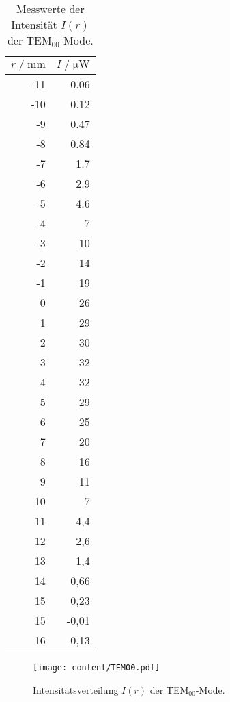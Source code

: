 \begin{table}[H]
  \centering
  \footnotesize
  \caption{Messwerte der Intensität $I(r)$ der TEM$_{00}$-Mode.}
  \label{tab:TEM00}
  \begin{tabular}{r r}
  \toprule
  $r \;/\; \si{\milli\meter}$ & $I \;/\; \si{\micro\watt}$ \\
  \midrule
-11 & -0.06   \\
-10 & 0.12    \\
-9  & 0.47    \\
-8  &  0.84   \\
-7  &  1.7    \\
-6  &  2.9    \\
-5  &  4.6    \\
-4  &  7    \\
-3  &  10   \\
-2  &  14   \\
-1  &  19   \\
0   &  26   \\
1   &  29   \\
2   &  30   \\
3   &  32   \\
4   &  32   \\
5   &  29   \\
6   &  25   \\
7   &  20   \\
8   &  16   \\
9   &  11   \\
10  &  7    \\
11  &  4,4    \\
12  &  2,6    \\
13  &  1,4    \\
14  &  0,66   \\
15  &  0,23   \\
15  &  -0,01    \\
16  &  -0,13    \\
  \bottomrule
  \end{tabular}
\end{table}

\begin{figure}[H]
  \centering
  \texttt{[image: content/TEM00.pdf]}
  \vspace{-10pt}
  \caption{Intensitätsverteilung $I(r)$ der TEM$_{00}$-Mode.}
  \label{fig:TEM00}
\end{figure}


